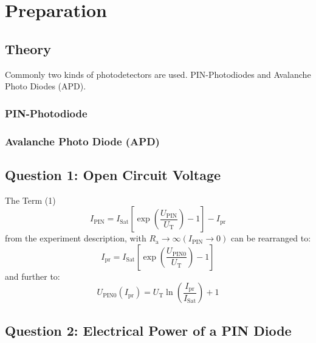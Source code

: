 \chapter{Preparation}

\section{Theory}
Commonly two kinds of photodetectors are used. PIN-Photodiodes and Avalanche Photo Diodes (APD).
\subsection{PIN-Photodiode}

\subsection{Avalanche Photo Diode (APD)}



\section{Question 1: Open Circuit Voltage}
The Term (1)
\begin{equation}
 I_{\mathrm{PIN}} = I_{\mathrm{Sat}}\left[\exp\left(\frac{U_{\mathrm{PIN}}}{U_{\mathrm{T}}}\right)-1\right] -I_{\mathrm{pr}}
\label{eq:diode}
\end{equation}
from the experiment description, with $R_{\mathrm{a}}\to\infty(I_{\mathrm{PIN}}\to0)$ can be rearranged to:
\begin{equation}
 I_{\mathrm{pr}} = I_{\mathrm{Sat}}\left[\exp\left(\frac{U_{\mathrm{PIN0}}}{U_{\mathrm{T}}}\right)-1\right]
\end{equation}
and further to:
\begin{equation}
 U_{\mathrm{PIN0}}(I_{\mathrm{pr}}) = U_{\mathrm{T}}\ln\left(\frac{I_{\mathrm{pr}}}{I_{\mathrm{Sat}}}\right)+1
\end{equation}

\section{Question 2: Electrical Power of a PIN Diode}

